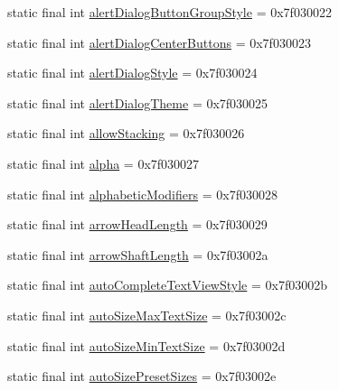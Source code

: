 \begin{DoxyCompactItemize}
\item 
static final int \mbox{\hyperlink{classandroid_1_1support_1_1v7_1_1appcompat_1_1R_1_1attr_a9cd8a90d273c546b9fbc041fdaef713d}{alert\+Dialog\+Button\+Group\+Style}} = 0x7f030022
\item 
static final int \mbox{\hyperlink{classandroid_1_1support_1_1v7_1_1appcompat_1_1R_1_1attr_afe960e6e9a8005c0227208863d89c130}{alert\+Dialog\+Center\+Buttons}} = 0x7f030023
\item 
static final int \mbox{\hyperlink{classandroid_1_1support_1_1v7_1_1appcompat_1_1R_1_1attr_a10699ad87a0819a6ab3fc99c1105e45b}{alert\+Dialog\+Style}} = 0x7f030024
\item 
static final int \mbox{\hyperlink{classandroid_1_1support_1_1v7_1_1appcompat_1_1R_1_1attr_a28f6a386e132437d00548463893aef86}{alert\+Dialog\+Theme}} = 0x7f030025
\item 
static final int \mbox{\hyperlink{classandroid_1_1support_1_1v7_1_1appcompat_1_1R_1_1attr_a6373691f67700e6c61a4bf5238fee215}{allow\+Stacking}} = 0x7f030026
\item 
static final int \mbox{\hyperlink{classandroid_1_1support_1_1v7_1_1appcompat_1_1R_1_1attr_a7a191c05c7dd29304dfbbd27a8fd68a9}{alpha}} = 0x7f030027
\item 
static final int \mbox{\hyperlink{classandroid_1_1support_1_1v7_1_1appcompat_1_1R_1_1attr_acb4014e1527ac9a51a7f3e1ad3c3676b}{alphabetic\+Modifiers}} = 0x7f030028
\item 
static final int \mbox{\hyperlink{classandroid_1_1support_1_1v7_1_1appcompat_1_1R_1_1attr_ada826d1f4aa2ea746c1abd4f99eb1df5}{arrow\+Head\+Length}} = 0x7f030029
\item 
static final int \mbox{\hyperlink{classandroid_1_1support_1_1v7_1_1appcompat_1_1R_1_1attr_ace00a2bee9d85338c3b35617f5b80946}{arrow\+Shaft\+Length}} = 0x7f03002a
\item 
static final int \mbox{\hyperlink{classandroid_1_1support_1_1v7_1_1appcompat_1_1R_1_1attr_ad5da727bf9b68654cd19ab7222a504a1}{auto\+Complete\+Text\+View\+Style}} = 0x7f03002b
\item 
static final int \mbox{\hyperlink{classandroid_1_1support_1_1v7_1_1appcompat_1_1R_1_1attr_a26f6b54ff86deaeb5fd5ca764146d7cd}{auto\+Size\+Max\+Text\+Size}} = 0x7f03002c
\item 
static final int \mbox{\hyperlink{classandroid_1_1support_1_1v7_1_1appcompat_1_1R_1_1attr_a2c527ce5b2661a5be141946033343826}{auto\+Size\+Min\+Text\+Size}} = 0x7f03002d
\item 
static final int \mbox{\hyperlink{classandroid_1_1support_1_1v7_1_1appcompat_1_1R_1_1attr_a560a07feaaba74f2673e11a6cd9030bb}{auto\+Size\+Preset\+Sizes}} = 0x7f03002e

\end{DoxyCompactItemize}
